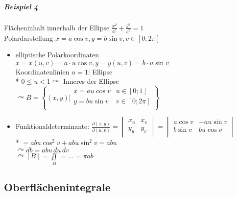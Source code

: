 \documentclass[a4paper]{scrartcl}
\begin{document}
\subparagraph{Beispiel 4} Flächeninhalt innerhalb der Ellipse $\frac{x^2}{a^2} + \frac{y^2}{b^2} = 1$\\
Polardarstellung $x= a \cos{v}, y=b\sin{v}, v \in [0;2\pi]$
\begin{itemize}
\item elliptische Polarkoordinaten $x=x(u,v) = a \cdot u \cos{v}, y=y(u,v) = b \cdot u \sin{v}$\\
Koordinatenlinien $u=1$: Ellipse\\*
$0\leq u <1 \curvearrowright$ Inneres der Ellipse\\
$\curvearrowright B= \left \{ (x,y)| \begin{array}{lr} x= a u \cos{v} & u \in [0;1] \\ y=bu\sin{v} & v \in [0;2\pi] \\ \end{array} \right \}$
\item Funktionaldeterminante: $\frac{\partial (x,y)}{\partial (u,v)} = \begin{vmatrix} x_u & x_v \\ y_u & y_v \\ \end{vmatrix} = \begin{vmatrix} a\cos{v} & -au\sin{v}\\ b\sin{v} & bu\cos{v} \\ \end{vmatrix}$\\*
$=abu \cos^2{v} + abu\sin^2{v} = abu$\\
$\curvearrowright db= abu \,du \, dv$\\
$\curvearrowright [B]= \iint\limits_B = \dots = \pi ab$
\end{itemize}

\subsection{Oberflächenintegrale}
\end{document}
